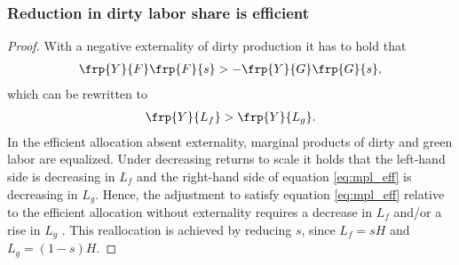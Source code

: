 \subsubsection{Reduction in dirty labor share is efficient}
\begin{proof}
	With a negative externality of dirty production it has to hold that 
	\begin{align}
	\frp{Y}{F}\frp{F}{s}>-\frp{Y}{G}\frp{G}{s},
	\end{align}
	which can be rewritten to 
	\begin{align}\label{eq:mpl_eff}
	\frp{Y}{L_f}>\frp{Y}{L_g}. 
	\end{align}
	In the efficient allocation absent externality, marginal products of dirty and green labor are equalized. 
	Under decreasing returns to scale it holds that the left-hand side is decreasing in $L_f$ and the right-hand side of equation \ref{eq:mpl_eff} is decreasing in $L_g$. Hence, the adjustment to satisfy equation \ref{eq:mpl_eff} relative to the efficient allocation without externality requires a decrease in $L_f$ and/or a rise in $L_g$  .
	This reallocation is achieved by reducing $s$, since $L_f=sH$ and $L_g=(1-s)H$.	
\end{proof}


